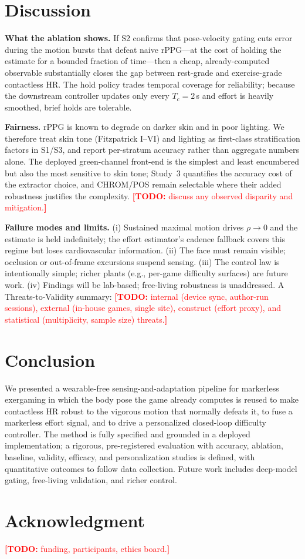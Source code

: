 \documentclass[journal,10pt]{IEEEtran}
\newcommand{\todoNote}[1]{\textcolor{red}{\textbf{[TODO:} #1\textbf{]}}}
\begin{document}
\section{Discussion}\label{sec:discussion}
\textbf{What the ablation shows.} If S2 confirms that pose-velocity gating cuts
error during the motion bursts that defeat naive rPPG---at the cost of holding the
estimate for a bounded fraction of time---then a cheap, already-computed observable
substantially closes the gap between rest-grade and exercise-grade contactless HR.
The hold policy trades temporal coverage for reliability; because the downstream
controller updates only every $T_c=2$\,s and effort is heavily smoothed, brief
holds are tolerable.

\textbf{Fairness.} rPPG is known to degrade on darker skin and in poor lighting.
We therefore treat skin tone (Fitzpatrick I--VI) and lighting as first-class
stratification factors in S1/S3, and report per-stratum accuracy rather than
aggregate numbers alone. The deployed green-channel front-end is the simplest and
least encumbered but also the most sensitive to skin tone; Study~3 quantifies the
accuracy cost of the extractor choice, and CHROM/POS remain selectable where their
added robustness justifies the complexity. \todoNote{discuss any observed
disparity and mitigation.}

\textbf{Failure modes and limits.} (i) Sustained maximal motion drives $\rho\to0$
and the estimate is held indefinitely; the effort estimator's cadence fallback
covers this regime but loses cardiovascular information. (ii) The face must remain
visible; occlusion or out-of-frame excursions suspend sensing. (iii) The control
law is intentionally simple; richer plants (e.g., per-game difficulty surfaces)
are future work. (iv) Findings will be lab-based; free-living robustness is
unaddressed. A Threats-to-Validity summary: \todoNote{internal (device sync,
author-run sessions), external (in-house games, single site), construct (effort
proxy), and statistical (multiplicity, sample size) threats.}

\section{Conclusion}\label{sec:conclusion}
We presented a wearable-free sensing-and-adaptation pipeline for markerless
exergaming in which the body pose the game already computes is reused to make
contactless HR robust to the vigorous motion that normally defeats it, to fuse a
markerless effort signal, and to drive a personalized closed-loop difficulty
controller. The method is fully specified and grounded in a deployed
implementation; a rigorous, pre-registered evaluation with accuracy, ablation,
baseline, validity, efficacy, and personalization studies is defined, with
quantitative outcomes to follow data collection. Future work includes deep-model
gating, free-living validation, and richer control.

\section*{Acknowledgment}
\todoNote{funding, participants, ethics board.}



\end{document}
